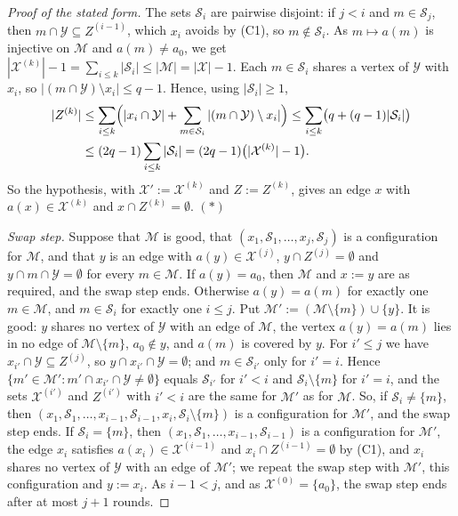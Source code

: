 \begin{proof}[Proof of the stated form]
The sets $\mathcal S_i$ are pairwise disjoint: if $j<i$ and
$m\in\mathcal S_j$, then $m\cap\mathcal Y\subseteq Z^{(i-1)}$, which $x_i$
avoids by (C1), so $m\notin\mathcal S_i$. As $m\mapsto a(m)$ is injective on
$\mathcal M$ and $a(m)\ne a_0$, we get
$|\mathcal X^{(k)}|-1=\sum_{i\le k}|\mathcal S_i|\le|\mathcal M|=|\mathcal X|-1$.
Each $m\in\mathcal S_i$ shares a vertex of $\mathcal Y$ with $x_i$, so
$|(m\cap\mathcal Y)\setminus x_i|\le q-1$. Hence, using $|\mathcal S_i|\ge1$,
\begin{align*}
|Z^{(k)}|&\le\sum_{i\le k}\Bigl(|x_i\cap\mathcal Y|
+\sum_{m\in\mathcal S_i}|(m\cap\mathcal Y)\setminus x_i|\Bigr)
\le\sum_{i\le k}\bigl(q+(q-1)|\mathcal S_i|\bigr)\\
&\le(2q-1)\sum_{i\le k}|\mathcal S_i|=(2q-1)\bigl(|\mathcal X^{(k)}|-1\bigr).
\end{align*}
So the hypothesis, with $\mathcal X':=\mathcal X^{(k)}$ and $Z:=Z^{(k)}$, gives
an edge $x$ with $a(x)\in\mathcal X^{(k)}$ and $x\cap Z^{(k)}=\emptyset$. $(*)$

\emph{Swap step.} Suppose that $\mathcal M$ is good, that
$(x_1,\mathcal S_1,\dots,x_j,\mathcal S_j)$ is a configuration for
$\mathcal M$, and that $y$ is an edge with $a(y)\in\mathcal X^{(j)}$,
$y\cap Z^{(j)}=\emptyset$ and $y\cap m\cap\mathcal Y=\emptyset$ for every
$m\in\mathcal M$. If $a(y)=a_0$, then $\mathcal M$ and $x:=y$ are as required,
and the swap step ends. Otherwise $a(y)=a(m)$ for exactly one $m\in\mathcal M$, and
$m\in\mathcal S_i$ for exactly one $i\le j$. Put
$\mathcal M':=(\mathcal M\setminus\{m\})\cup\{y\}$. It is good: $y$ shares no
vertex of $\mathcal Y$ with an edge of $\mathcal M$, the vertex $a(y)=a(m)$
lies in no edge of $\mathcal M\setminus\{m\}$, $a_0\notin y$, and $a(m)$ is
covered by $y$. For $i'\le j$ we have $x_{i'}\cap\mathcal Y\subseteq Z^{(j)}$,
so $y\cap x_{i'}\cap\mathcal Y=\emptyset$; and $m\in\mathcal S_{i'}$ only for
$i'=i$. Hence
$\{m'\in\mathcal M':m'\cap x_{i'}\cap\mathcal Y\ne\emptyset\}$ equals
$\mathcal S_{i'}$ for $i'<i$ and $\mathcal S_i\setminus\{m\}$ for $i'=i$, and
the sets $\mathcal X^{(i')}$ and $Z^{(i')}$ with $i'<i$ are the same for
$\mathcal M'$ as for $\mathcal M$. So, if $\mathcal S_i\ne\{m\}$, then
$(x_1,\mathcal S_1,\dots,x_{i-1},\mathcal S_{i-1},x_i,\mathcal S_i\setminus\{m\})$
is a configuration for $\mathcal M'$, and the swap step ends. If $\mathcal S_i=\{m\}$,
then $(x_1,\mathcal S_1,\dots,x_{i-1},\mathcal S_{i-1})$ is a configuration for
$\mathcal M'$, the edge $x_i$ satisfies $a(x_i)\in\mathcal X^{(i-1)}$ and
$x_i\cap Z^{(i-1)}=\emptyset$ by (C1), and $x_i$ shares no vertex of
$\mathcal Y$ with an edge of $\mathcal M'$; we repeat the swap step with
$\mathcal M'$, this configuration and $y:=x_i$. As $i-1<j$, and as
$\mathcal X^{(0)}=\{a_0\}$, the swap step ends after at most $j+1$ rounds.


\end{proof}
